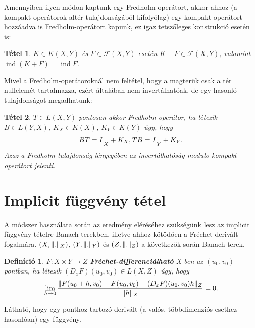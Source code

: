 \documentclass[oneside, titlepage, 12pt, a4paper]{report}
\newtheorem{theorem}{Tétel}[section]
\newtheorem{definition}{Definíció}[section]
\DeclareMathOperator{\ind}{ind}	%
\DeclarePairedDelimiter\norm{\lVert}{\rVert}	%
\begin{document}
Amennyiben ilyen módon kaptunk egy Fredholm-operátort, akkor ahhoz (a kompakt operátorok altér-tulajdonságából kifolyólag) egy kompakt operátort hozzáadva is Fredholm-operátort kapunk, ez igaz tetszőleges konstrukció esetén is:
\begin{theorem}
$K \in K(X, Y)$ és $F \in \mathcal{F}(X, Y)$ esetén $K + F \in \mathcal{F}(X, Y)$, valamint $\ind(K + F) = \ind F$. \cite{FcNotex}
\end{theorem}

Mivel a Fredholm-operátoroknál nem feltétel, hogy a magterük csak a tér nullelemét tartalmazza, ezért általában nem invertálhatóak, de egy hasonló tulajdonságot megadhatunk:	%
\begin{theorem}
$T \in L(X, Y)$ pontosan akkor Fredholm-operátor, ha létezik $B \in L(Y, X)$, $K_X \in K(X)$, $K_Y \in K(Y)$ úgy, hogy
\begin{equation*}
BT = I_{\mkern 1mu \vrule height 2ex\mkern2mu X} + K_X, TB = I_{\mkern 1mu \vrule height 2ex\mkern2mu Y} + K_Y.
\end{equation*}
Azaz a Fredholm-tulajdonság lényegében az invertálhatóság modulo kompakt operátort jelenti. \cite{FcNotex, diffun2}
\end{theorem}

%
\section{Implicit függvény tétel}
\label{sec:implicitfvtetel}

A módszer használata során az eredmény eléréséhez szükségünk lesz az implicit függvény tételre Banach-terekben, illetve ahhoz kötődően a Fréchet-derivált fogalmára. $(X, \norm{.}_X)$, $(Y, \norm{.}_Y)$ és $(Z, \norm{.}_Z)$ a következők során Banach-terek.

\begin{definition}
$F : X \times Y \rightarrow Z$ \textbf{Fréchet-differenciálható} X-ben az $(u_0, v_0)$ pontban, ha létezik $(D_xF)(u_0, v_0) \in L(X, Z)$ úgy, hogy
\begin{equation*}
\lim_{h \to 0} \frac{\norm{F(u_0 + h, v_0) - F(u_0, v_0) - (D_xF)(u_0, v_0)h}_Z}{\norm{h}_X} = 0.
\end{equation*}
\end{definition}
Látható, hogy egy ponthoz tartozó derivált (a valós, többdimenziós esethez hasonlóan) egy függvény.
\end{document}
